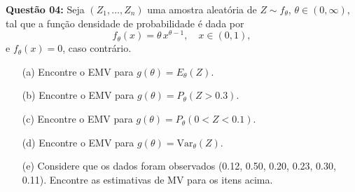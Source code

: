 \documentclass[a4paper]{article}
\begin{document}
    \begin{answer}[]

    \end{answer}

\textbf{Questão 04:}  
Seja $(Z_1, \ldots, Z_n)$ uma amostra aleatória de $Z \sim f_\theta$, $\theta \in (0,\infty)$, tal que a função densidade de probabilidade é dada por  
\[
f_\theta(x) = \theta \, x^{\theta-1}, \quad x \in (0,1),
\]
e $f_\theta(x) = 0$, caso contrário.
\begin{itemize}
  \item[(a)] Encontre o EMV para $g(\theta) = E_\theta(Z)$.
  \item[(b)] Encontre o EMV para $g(\theta) = P_\theta(Z > 0.3)$.
  \item[(c)] Encontre o EMV para $g(\theta) = P_\theta(0 < Z < 0.1)$.
  \item[(d)] Encontre o EMV para $g(\theta) = \mathrm{Var}_\theta(Z)$.
  \item[(e)] Considere que os dados foram observados (0.12, 0.50, 0.20, 0.23, 0.30, 0.11). Encontre as estimativas de MV para os itens acima.
\end{itemize}

    \begin{answer}[]

    \end{answer}
\end{document}
